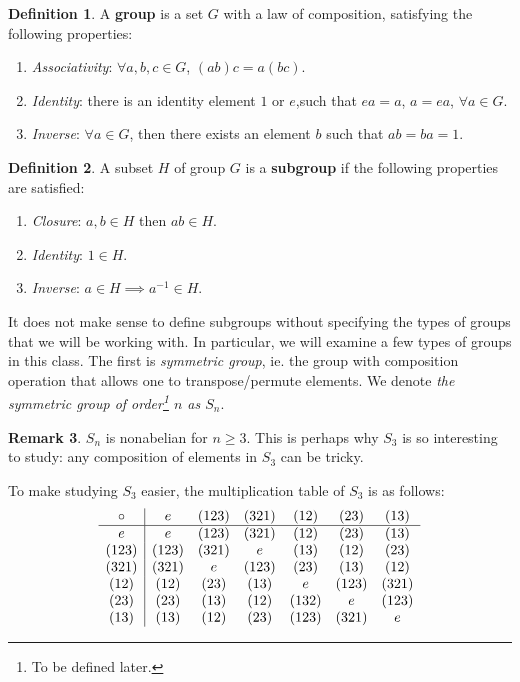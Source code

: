 \documentclass[11pt]{amsart} %
\theoremstyle{definition}
\newtheorem{definition}{Definition}[section]
\theoremstyle{definition}
\newtheorem{remark}[definition]{Remark}
\numberwithin{equation}{section}
\begin{document}
\begin{definition}
	A \textbf{group} is a set $G$ with a law of composition, satisfying the following properties:
	\begin{enumerate}[noitemsep]
		\item \textit{Associativity}: $\forall a,b,c \in G$, $(ab)c = a(bc)$.
		\item \textit{Identity}: there is an identity element $1$ or $e$,such that $ea=a$, $a=ea$, $\forall a \in G$.
		\item \textit{Inverse}: $\forall a \in G$, then there exists an element $b$ such that $ab = ba = 1$.
	\end{enumerate}
\end{definition}

\begin{definition}
	A subset $H$ of group $G$ is a \textbf{subgroup} if the following properties are satisfied:
	\begin{enumerate}[noitemsep]
		\item \textit{Closure}: $a,b \in H$ then $ab \in H$.
		\item \textit{Identity}: $1 \in H$.
		\item \textit{Inverse}: $a \in H \implies a^{-1} \in H$.
	\end{enumerate}
\end{definition}

It does not make sense to define subgroups without specifying the types of groups that we will be working with. In particular, we will examine a few types of groups in this class. The first is \textit{symmetric group}, ie. the group with composition operation that allows one to transpose/permute elements. We denote \textit{the symmetric group of order\footnote{To be defined later.} $n$ as $S_n$}.

\begin{remark}
	$S_n$ is nonabelian for $n\geq 3$. This is perhaps why $S_3$ is so interesting to study: any composition of elements in $S_3$ can be tricky.
\end{remark}

To make studying $S_3$ easier, the multiplication table of $S_3$ is as follows:
$$\begin{array}{c | c c c c c c}
	\circ & e & (123) & (321) & (12) & (23) & (13) \\
	\hline
	e & e & (123) & (321) & (12) & (23) & (13) \\
	(123) & (123) & (321) & e & (13) & (12) & (23) \\
	(321) & (321) & e & (123) & (23) & (13) & (12) \\
	(12) & (12) & (23) & (13) & e & (123) & (321) \\
	(23) & (23) & (13) & (12) & (132) & e & (123) \\
	(13) & (13) & (12) & (23) & (123) & (321) & e \\
\end{array}$$
\end{document}
